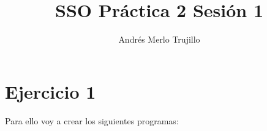 \documentclass{article}
\title{SSO Práctica 2 Sesión 1}
\author{Andrés Merlo Trujillo}
\date{}
\begin{document}
\maketitle

\tableofcontents

\newpage

\section*{Ejercicio 1}

Para ello voy a crear los siguientes programas:
\end{document}
